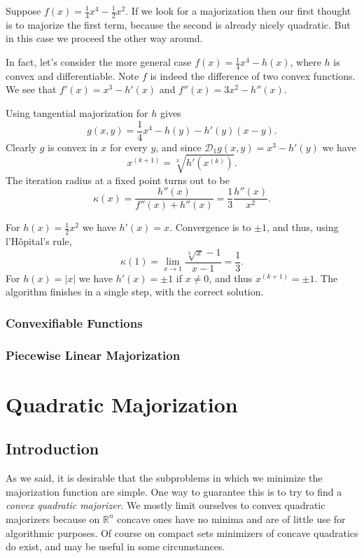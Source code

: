 \documentclass[
  12pt,
]{book}
\begin{document}
Suppose \(f(x)=\frac14 x^4-\frac12 x^2\). If we look for a majorization then our first thought is to majorize the first term, because the second is already nicely quadratic. But in this case we proceed the other way around.

In fact, let's consider the more general case \(f(x)=\frac14 x^4-h(x)\), where \(h\) is convex and
differentiable. Note \(f\) is indeed the difference of
two convex functions. We see
that \(f'(x)=x^3-h'(x)\) and \(f''(x)=3x^2-h''(x)\).

Using tangential majorization for \(h\) gives
\[
g(x,y)=\frac14 x^4-h(y)-h'(y)(x-y).
\]
Clearly \(g\) is convex in \(x\) for every \(y\), and since \(\mathcal{D}_1g(x,y)=x^3-h'(y)\) we have
\[
x^{(k+1)}=\sqrt[3]{h'(x^{(k)})}.
\]
The iteration radius at a fixed point turns out to be
\[
\kappa(x)=\frac{h''(x)}{f''(x)+h''(x)}=\frac13\frac{h''(x)}{x^2}.
\]

For \(h(x)=\frac12 x^2\) we have \(h'(x)=x\). Convergence is to \(\pm 1\), and thus, using l'Hôpital's rule,
\[
\kappa(1)=\lim_{x\rightarrow 1}\frac{\sqrt[3]{x}-1}{x-1}=\frac13.
\]
For \(h(x)=|x|\) we have \(h'(x)=\pm 1\) if \(x\not= 0\), and thus \(x^{(k+1)}=\pm 1.\) The algorithm finishes in a single step, with the correct solution.

\hypertarget{convexifiable-functions}{%
\subsection{Convexifiable Functions}\label{convexifiable-functions}}

\hypertarget{piecewise-linear-majorization}{%
\subsection{Piecewise Linear Majorization}\label{piecewise-linear-majorization}}

\hypertarget{quadratic-majorization}{%
\chapter{Quadratic Majorization}\label{quadratic-majorization}}

\hypertarget{introduction-4}{%
\section{Introduction}\label{introduction-4}}

As we said, it is desirable that the subproblems in which we minimize the majorization function are simple. One way to guarantee this is to try to find a \emph{convex quadratic majorizer}. We mostly limit ourselves to convex quadratic majorizers because on \(\mathbb{R}^n\) concave ones have no minima and are of little use for algorithmic purposes. Of course on compact sets minimizers of concave quadratics do exist,
and may be useful in some circumstances.
\end{document}
